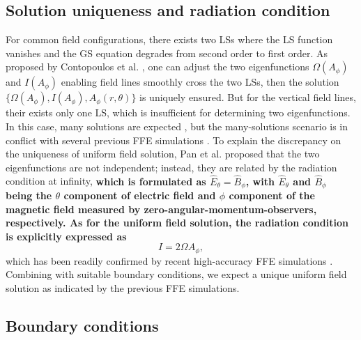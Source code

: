 \documentclass[aps,prd,reprint,nofootinbib, superscriptaddress]{revtex4-1}
\def\Ap{A_\phi}
\def\be{\begin{equation}}
\def\ee{\end{equation}}
\begin{document}
\subsection{Solution uniqueness and radiation condition}
For common field configurations, there exists two LSs where
the LS function vanishes and the GS equation degrades from second order to first order. As proposed
by Contopoulos et al. \cite{Contopoulos2013}, one can adjust the two eigenfunctions $\Omega(\Ap)$
and $I(\Ap)$ enabling field lines smoothly cross the two LSs, then the solution
$\{\Omega(\Ap), I(\Ap), \Ap(r,\theta)\}$  is uniquely ensured. But for the vertical field lines, their
exists only one LS, which is insufficient for determining two eigenfunctions.
In this case, many solutions are expected \cite{Nathanail2014, Mahlmann2018}, but the many-solutions scenario is in
conflict with several previous FFE simulations \cite{Komissarov2004e, Komissarov2005,
Komissarov2007,Palenzuela2010,Paschalidis2013,Yang2015,Carrasco2017}.
To explain the discrepancy on the uniqueness of uniform field solution,
Pan et al. \cite{Pan2016a, Pan2017} proposed that the two eigenfunctions are not independent;
instead, they are related by the radiation condition at infinity, {\bf which is formulated as
$\hat E_\theta = \hat B_\phi$, with $\hat E_\theta$ and $\hat B_\phi$ being the $\theta$
component of electric field and $\phi$ component of the magnetic field measured by zero-angular-momentum-observers, respectively.
As for the uniform field solution, the radiation condition is explicitly expressed as }
\be I = 2\Omega A_\phi, \label{eq:rad}\ee
which has been readily confirmed by recent high-accuracy FFE simulations \cite{East2018}.
Combining with suitable boundary conditions, we expect a unique uniform field solution as indicated
by the previous FFE simulations.

\subsection{Boundary conditions}
\end{document}
